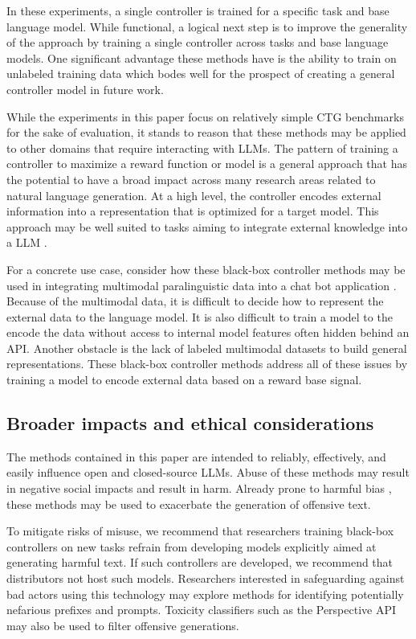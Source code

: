 \documentclass[phd,electronic,oneside,twosidetoc,letterpaper,chaptercenter,parttop,lof]{byumsphd}
\begin{document}
In these experiments, a single controller is trained for a specific task and base language model.
While functional, a logical next step is to improve the generality of the approach by training a single controller across tasks and base language models. 
One significant advantage these methods have is the ability to train on unlabeled training data which bodes well for the prospect of creating a general controller model in future work.

While the experiments in this paper focus on relatively simple CTG benchmarks for the sake of evaluation, it stands to reason that these methods may be applied to other domains that require interacting with LLMs. 
The pattern of training a controller to maximize a reward function or model is a general approach that has the potential to have a broad impact across many research areas related to natural language generation.
At a high level, the controller encodes external information into a representation that is optimized for a target model.  This approach may be well suited to tasks aiming to integrate external knowledge into a LLM \citep{liu2019kalm, peters2019knowbert, wang2021kepler, morain2022symbolic}.

For a concrete use case, consider how these black-box controller methods may be used in integrating multimodal paralinguistic data into a chat bot application \cite{rumi}.
Because of the multimodal data, it is difficult to decide how to represent the external data to the language model.
It is also difficult to train a model to the encode the data without access to internal model features often hidden behind an API.
Another obstacle is the lack of labeled multimodal datasets to build general representations.
These black-box controller methods address all of these issues by training a model to encode external data based on a reward base signal.

\subsection{Broader impacts and ethical considerations}

The methods contained in this paper are intended to reliably, effectively, and easily influence open and closed-source LLMs. 
Abuse of these methods may result in negative social impacts and result in harm.
Already prone to harmful bias \citep{sheng2019bias}, these methods may be used to exacerbate the generation of offensive text.

To mitigate risks of misuse, we recommend that researchers training black-box controllers on new tasks refrain from developing models explicitly aimed at generating harmful text.
If such controllers are developed, we recommend that distributors not host such models.
Researchers interested in safeguarding against bad actors using this technology may explore methods for identifying potentially nefarious prefixes and prompts.
Toxicity classifiers such as the Perspective API may also be used to filter offensive generations.
\end{document}
